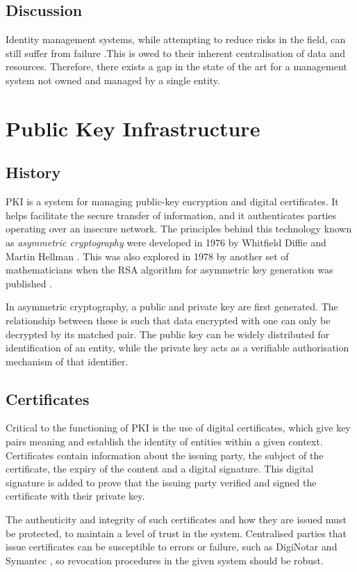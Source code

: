 \subsection{Discussion}
Identity management systems, while attempting to reduce risks in the field, can still suffer from failure \cite{mimoso_office_2016, low_serious_2014}.This is owed to their inherent centralisation of data and resources. Therefore, there exists a gap in the state of the art for a management system not owned and managed by a single entity.

\section{Public Key Infrastructure}
\subsection{History}
\ac{PKI} is a system for managing public-key encryption and digital certificates. It helps facilitate the secure transfer of information, and it authenticates parties operating over an insecure network. The principles behind this technology known as \textit{asymmetric cryptography} were developed in 1976 by Whitfield Diffie and Martin Hellman \cite{diffie_new_1976}. This was also explored in 1978 by another set of mathematicians when the RSA algorithm for asymmetric key generation was published \cite{rivest_method_1978}.

In asymmetric cryptography, a public and private key are first generated. The relationship between these is such that data encrypted with one can only be decrypted by its matched pair. The public key can be widely distributed for identification of an entity, while the private key acts as a verifiable authorisation mechanism of that identifier.

\subsection{Certificates}
Critical to the functioning of \ac{PKI} is the use of digital certificates, which give key pairs meaning and establish the identity of entities within a given context. Certificates contain information about the issuing party, the subject of the certificate, the expiry of the content and a digital signature. This digital signature is added to prove that the issuing party verified and signed the certificate with their private key. 

The authenticity and integrity of such certificates and how they are issued must be protected, to maintain a level of trust in the system. Centralised parties that issue certificates can be susceptible to errors or failure, such as DigiNotar \cite{the_associated_press_hacking_2011} and Symantec  \cite{ayer_misissued/suspicious_2017}, so revocation procedures in the given system should be robust.

